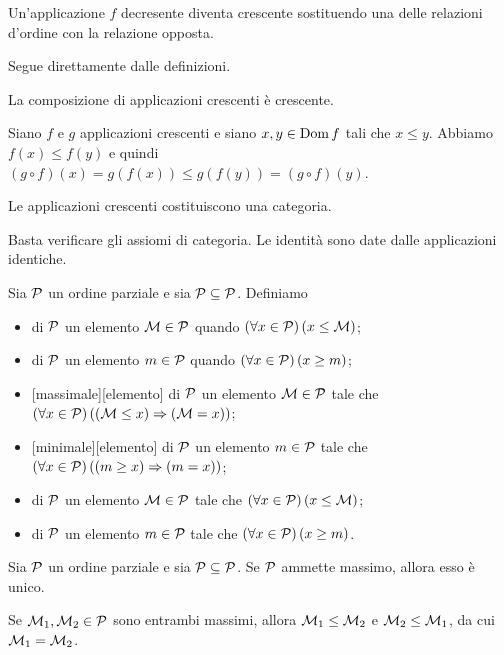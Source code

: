 \begin{Theorem}
	Un'applicazione $f$ decresente diventa crescente sostituendo una delle relazioni d'ordine con la relazione opposta.
\end{Theorem}
\Proof Segue direttamente dalle definizioni. \EndProof
\begin{Theorem}
	La composizione di applicazioni crescenti \`e crescente. 
\end{Theorem}
\Proof Siano $f$ e $g$ applicazioni crescenti e siano $x, y \in \operatorname{Dom}{f}$ tali che $x \leq y$. Abbiamo $f(x) \leq f(y)$ e quindi $(g \circ f)(x) = g(f(x)) \leq g(f(y)) = (g \circ f)(y)$. \EndProof
\begin{Theorem}
	Le applicazioni crescenti costituiscono una categoria.
\end{Theorem}
\Proof Basta verificare gli assiomi di categoria. Le identit\`a sono date dalle applicazioni identiche. \EndProof
\begin{Definition}
	Sia $\mathcal{P}$ un ordine parziale e sia $\mathcal{P} \subseteq \mathcal{P}$. Definiamo
	\begin{itemize}
		\item {} di $\mathcal{P}$ un elemento $\mathcal{M} \in \mathcal{P}$ quando $\left ( \forall x \in \mathcal{P} \right ) \left ( x \leq \mathcal{M} \right )$;
		\item {} di $\mathcal{P}$ un elemento $m \in \mathcal{P}$ quando $\left ( \forall x \in \mathcal{P} \right ) \left ( x \geq m \right )$;
		\item {}[massimale][elemento] di $\mathcal{P}$ un elemento $\mathcal{M} \in \mathcal{P}$ tale che $\left ( \forall x \in \mathcal{P} \right ) \left ( \left ( \mathcal{M} \leq x \right ) \Rightarrow \left ( \mathcal{M} = x \right ) \right )$;
		\item {}[minimale][elemento] di $\mathcal{P}$ un elemento $m \in \mathcal{P}$ tale che $\left ( \forall x \in \mathcal{P} \right ) \left ( \left ( m \geq x \right ) \Rightarrow \left ( m = x \right ) \right )$;
		\item {} di $\mathcal{P}$ un elemento $\mathcal{M} \in \mathcal{P}$ tale che $\left ( \forall x \in \mathcal{P} \right ) \left ( x \leq \mathcal{M} \right )$;
		\item {} di $\mathcal{P}$ un elemento $m \in \mathcal{P}$ tale che $\left ( \forall x \in \mathcal{P} \right ) \left ( x \geq m \right )$.
	\end{itemize}
\end{Definition}
\begin{Theorem}
	Sia $\mathcal{P}$ un ordine parziale e sia $\mathcal{P} \subseteq \mathcal{P}$. Se $\mathcal{P}$ ammette massimo, allora esso \`e unico.
\end{Theorem}
\Proof Se $\mathcal{M}_1, \mathcal{M}_2 \in \mathcal{P}$ sono entrambi massimi, allora $\mathcal{M}_1 \leq \mathcal{M}_2$ e $\mathcal{M}_2 \leq \mathcal{M}_1$, da cui $\mathcal{M}_1 = \mathcal{M}_2$. \EndProof
